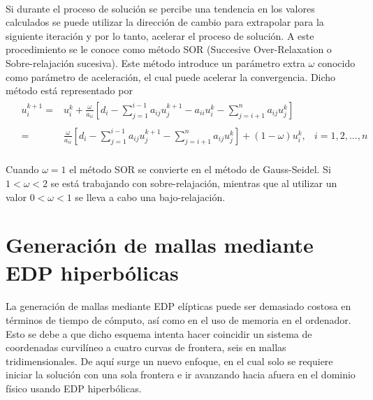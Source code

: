 \documentclass[letterpaper, openright, 12pt]{book}
\begin{document}
				\paragraph*{}
					Si durante el proceso de solución se percibe una tendencia en los valores calculados se puede utilizar la dirección de cambio para extrapolar para la siguiente iteración y por lo tanto, acelerar el proceso de solución. A este procedimiento se le conoce como método SOR (Succesive Over-Relaxation o  Sobre-relajación sucesiva). Este método introduce un parámetro extra $\omega$ conocido como parámetro de aceleración, el cual puede acelerar la convergencia. Dicho método está representado por
					\begin{align}
						&\begin{aligned}
							u_{i}^{k+1} =& u_{i}^{k} + \frac{\omega}{a_{ii}} \left[ d_{i} - \sum_{j = 1}^{i - 1}a_{ij}u_{j}^{k+1} - a_{ii}u_{i}^{k} - \sum_{j = i+1}^{n} a_{ij}u_{j}^{k} \right]
							\\ \\
							=& \frac{\omega}{a_{ii}} \left[ d_{i} - \sum_{j = 1}^{i - 1} a_{ij}u_{j}^{k+1} - \sum_{j = i+1}^{n} a_{ij}u_j ^{k}\right] + \left( 1 - \omega \right) u_{i}^{k}, &i = 1, 2, \dotsc, n
						\end{aligned}
					\end{align}
				
				\paragraph*{}
					Cuando $\omega = 1$ el método SOR se convierte en el método de Gauss-Seidel. Si $1 < \omega < 2$ se está trabajando con sobre-relajación, mientras que al utilizar un valor $0 < \omega < 1$ se lleva a cabo una bajo-relajación.
		
		\section{Generación de mallas mediante EDP hiperbólicas}
		\paragraph*{}
			La generación de mallas mediante EDP elípticas puede ser demasiado costosa en términos de tiempo de cómputo, así como en el uso de memoria en el ordenador. Esto se debe a que dicho esquema intenta hacer coincidir un sistema de coordenadas curvilíneo a cuatro curvas de frontera, seis en mallas tridimensionales. De aquí surge un nuevo enfoque, en el cual solo se requiere iniciar la solución con una sola frontera e ir avanzando hacia afuera en el dominio físico usando EDP hiperbólicas. \cite{farrashkhalvat}
		
\end{document}
